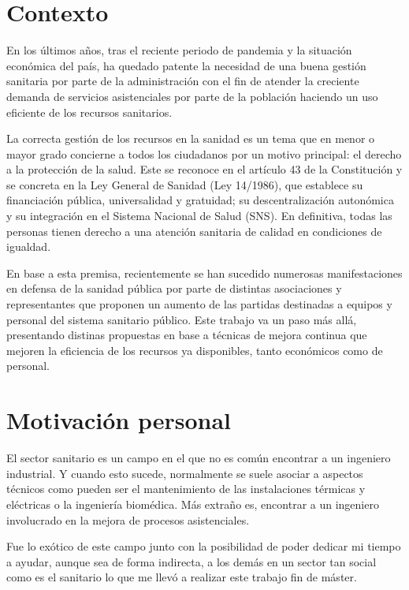 \section{Contexto}

En los últimos años, tras el reciente periodo de pandemia y la situación económica del país, ha quedado patente la necesidad de una buena gestión sanitaria por parte de la administración con el fin de atender la creciente demanda de servicios asistenciales por parte de la población haciendo un uso eficiente de los recursos sanitarios.

La correcta gestión de los recursos en la sanidad es un tema que en menor o mayor grado concierne a todos los ciudadanos por un motivo principal: el derecho a la protección de la salud. Este se reconoce en el artículo 43 de la Constitución y se concreta en la Ley General de Sanidad (Ley 14/1986), que establece su financiación pública, universalidad y gratuidad; su descentralización autonómica y su integración en el Sistema Nacional de Salud (SNS). En definitiva, todas las personas tienen derecho a una atención sanitaria de calidad en condiciones de igualdad.

En base a esta premisa, recientemente se han sucedido numerosas manifestaciones en defensa de la sanidad pública por parte de distintas asociaciones y representantes que proponen un aumento de las partidas destinadas a equipos y personal del sistema sanitario público. Este trabajo va un paso más allá, presentando distinas propuestas en base a técnicas de mejora continua que mejoren la eficiencia de los recursos ya disponibles, tanto económicos como de personal.

\section{Motivación personal}

El sector sanitario es un campo en el que no es común encontrar a un ingeniero industrial. Y cuando esto sucede, normalmente se suele asociar a aspectos técnicos como pueden ser el mantenimiento de las instalaciones térmicas y eléctricas o la ingeniería biomédica. Más extraño es, encontrar a un ingeniero involucrado en la mejora de procesos asistenciales.

Fue lo exótico de este campo junto con la posibilidad de poder dedicar mi tiempo a ayudar, aunque sea de forma indirecta, a los demás en un sector tan social como es el sanitario lo que me llevó a realizar este trabajo fin de máster.

